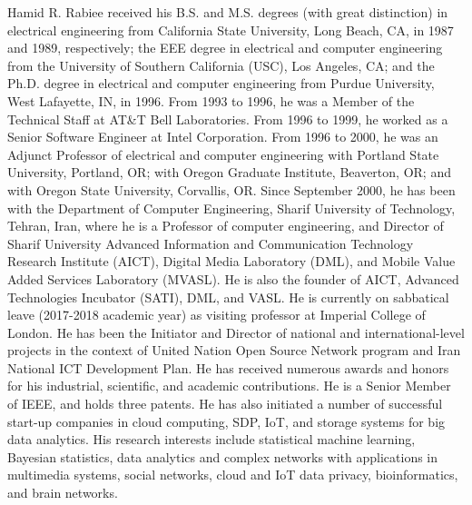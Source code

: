 \documentclass[10pt,journal,compsoc]{IEEEtran}
\begin{document}
\begin{IEEEbiography}{Hamid R. Rabiee}
received his B.S. and M.S. degrees (with great distinction) in electrical engineering from California State University, Long Beach, CA, in 1987 and 1989, respectively; the EEE degree in electrical and computer engineering from the University of Southern California (USC), Los Angeles, CA; and the Ph.D. degree in electrical and computer engineering from Purdue University, West Lafayette, IN, in 1996. From 1993 to 1996, he was a Member of the Technical Staff at AT\&T Bell Laboratories. From 1996 to 1999, he worked as a Senior Software Engineer at Intel Corporation. From 1996 to 2000, he was an Adjunct Professor of electrical and computer engineering with Portland State University, Portland, OR; with Oregon Graduate Institute, Beaverton, OR; and with Oregon State University, Corvallis, OR. Since September 2000, he has been with the Department of Computer Engineering, Sharif University of Technology, Tehran, Iran, where he is a Professor of computer engineering, and Director of Sharif University Advanced Information and Communication Technology Research Institute (AICT), Digital Media Laboratory (DML), and Mobile Value Added Services Laboratory (MVASL). He is also the founder of AICT, Advanced Technologies Incubator (SATI), DML, and VASL. He is currently on sabbatical leave (2017-2018 academic year) as visiting professor at Imperial College of London. He has been the Initiator and Director of national and international-level projects in the context of United Nation Open Source Network program and Iran National ICT Development Plan. He has received numerous awards and honors for his industrial, scientific, and academic contributions. He is a Senior Member of IEEE, and holds three patents. He has also initiated a number of successful start-up companies in cloud computing, SDP, IoT, and storage systems for big data analytics. His research interests include statistical machine learning, Bayesian statistics, data analytics and complex networks with applications in multimedia systems, social networks, cloud and IoT data privacy, bioinformatics, and brain networks.
\end{IEEEbiography}
\end{document}

